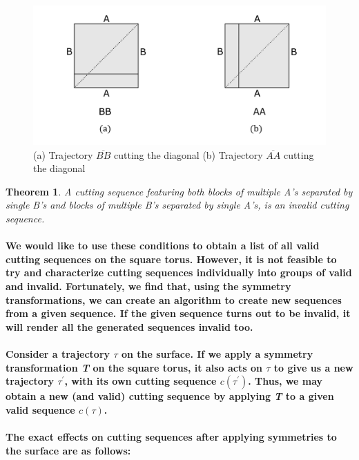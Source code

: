 \documentclass{report}
\newtheorem{theorem}{Theorem}[chapter]
\begin{document}
\begin{figure}[h] 
\begin{center}
\includegraphics[scale=0.3]{2.9}
\caption{(a) Trajectory $\overline{BB}$ cutting the diagonal (b) Trajectory $\overline{AA}$ cutting the diagonal
}
\end{center}
\end{figure}

\begin{theorem}
A cutting sequence featuring both blocks of multiple A’s separated by single B’s and blocks of multiple B’s separated by single A’s, is an invalid cutting sequence.
\end{theorem}

\paragraph{We would like to use these conditions to obtain a list of all valid cutting sequences on the square torus. However, it is not feasible to try and characterize cutting sequences individually into groups of valid and invalid. Fortunately, we find that, using the symmetry transformations, we can create an algorithm to create new sequences from a given sequence. If the given sequence turns out to be invalid, it will render all the generated sequences invalid too.}

\paragraph{Consider a trajectory $\tau$ on the surface. If we apply a symmetry transformation \textit{T} on the square torus, it also acts on $\tau$ to give us a new trajectory $\tau^{'}$, with its own cutting sequence $c(\tau^{'})$. Thus, we may obtain a new (and valid) cutting sequence by applying \textit{T} to a given valid sequence  $c(\tau)$.}

\paragraph{The exact effects on cutting sequences after applying symmetries to the surface are as follows:}
\end{document}
